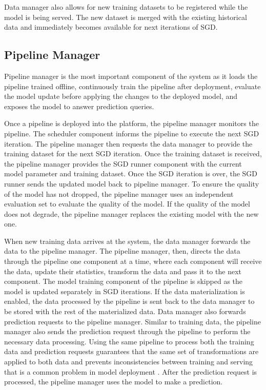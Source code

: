 Data manager also allows for new training datasets to be registered while the model is being served.
The new dataset is merged with the existing historical data and immediately becomes available for next iterations of SGD.

\subsection{Pipeline Manager} \label{pipeline-manager} 
Pipeline manager is the most important component of the system as it loads the pipeline trained offline, continuously train the pipeline after deployment, evaluate the model update before applying the changes to the deployed model, and exposes the model to answer prediction queries.

Once a pipeline is deployed into the platform, the pipeline manager monitors the pipeline.
The scheduler component informs the pipeline to execute the next SGD iteration.
The pipeline manager then requests the data manager to provide the training dataset for the next SGD iteration.
Once the training dataset is received, the pipeline manager provides the SGD runner component with the current model parameter and training dataset.
Once the SGD iteration is over, the SGD runner sends the updated model back to pipeline manager.
To ensure the quality of the model has not dropped, the pipeline manager uses an independent evaluation set to evaluate the quality of the model.
If the quality of the model does not degrade, the pipeline manager replaces the existing model with the new one.

When new training data arrives at the system, the data manager forwards the data to the pipeline manager. 
The pipeline manager, then, directs the data through the pipeline one component at a time, where each component will receive the data, update their statistics, transform the data and pass it to the next component.
The model training component of the pipeline is skipped as the model is updated separately in SGD iterations.
If the data materialization is enabled, the data processed by the pipeline is sent back to the data manager to be stored with the rest of the materialized data.
Data manager also forwards prediction requests to the pipeline manager.
Similar to training data, the pipeline manager also sends the prediction request through the pipeline to perform the necessary data processing.
Using the same pipeline to process both the training data and prediction requests guarantees that the same set of transformations are applied to both data and prevents inconsistencies between training and serving that is a common problem in model deployment \cite{baylor2017tfx}.
After the prediction request is processed, the pipeline manager uses the model to make a prediction.

